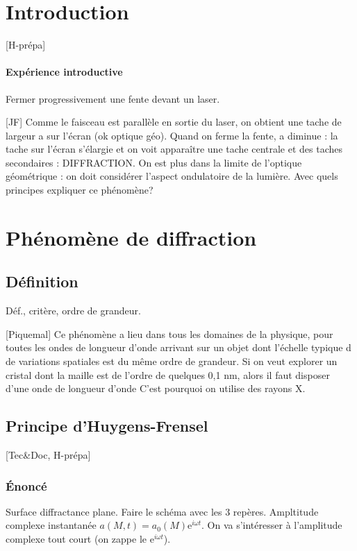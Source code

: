 \documentclass[11pt]{report}
\numberwithin{figure}{section}
\numberwithin{equation}{section}
\numberwithin{table}{section}
\newcommand{\e}{\mathrm{e}}
\newcommand{\1}{\boldsymbol{1}}
\begin{document}
\section*{Introduction}

[H-prépa] 

\paragraph*{Expérience introductive} Fermer progressivement une fente devant un laser.

[JF] Comme le faisceau est parallèle en sortie du laser, on obtient une tache de largeur a sur l’écran (ok optique géo). Quand on ferme la fente, a diminue : la tache sur l’écran s’élargie et on voit apparaître une tache centrale et des taches secondaires : DIFFRACTION. On est plus dans la limite de l’optique géométrique : on doit considérer l’aspect ondulatoire de la lumière. Avec quels principes expliquer ce phénomène?

\section{Phénomène de diffraction}

\subsection{Définition}

Déf., critère, ordre de grandeur.

[Piquemal] Ce phénomène a lieu dans tous les domaines de la physique, pour toutes les ondes de longueur d’onde arrivant sur un objet dont l’échelle typique d de variations spatiales est du même ordre de grandeur. Si on veut explorer un cristal dont la maille est de l’ordre de quelques 0,1 nm, alors il faut disposer d’une onde de longueur d’onde C’est pourquoi on utilise des rayons X.


\subsection{Principe d'Huygens-Frensel}

[Tec\&Doc, H-prépa]


\subsubsection{Énoncé}

Surface diffractance plane. Faire le schéma avec les 3 repères. Ampltitude complexe instantanée $a(M,t) = a_0(M) \e^{i \omega t}$. On va s'intéresser à l'amplitude complexe tout court (on zappe le $ \e^{i \omega t}$).
\end{document}
